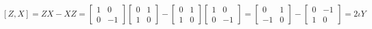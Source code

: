 \begin{example}
\[    \]
    \[
    [Z,X]=ZX-XZ=\begin{bmatrix} 1 & 0 \\ 0 & -1 \end{bmatrix}\begin{bmatrix} 0 & 1 \\ 1 & 0 \end{bmatrix} - \begin{bmatrix}0 & 1 \\ 1 & 0 \end{bmatrix} \begin{bmatrix} 1 & 0 \\ 0 & -1 \end{bmatrix} = \begin{bmatrix} 0 & 1 \\ -1 & 0 \end{bmatrix} - \begin{bmatrix} 0 & -1 \\ 1 & 0 \end{bmatrix} =2\iota Y
    \]
\end{example}
